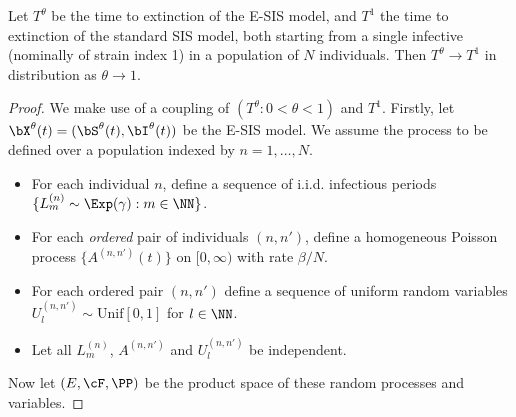 \documentclass[smallextended]{svjour3}       %
\begin{document}
\begin{mythm}\label{thm: tt 1}
	Let $T^{\theta}$ be the time to extinction of the E-SIS model, and $T^1$ the time to extinction of the standard SIS model, both starting from a single infective (nominally of strain index 1) in a population of $N$ individuals. Then $T^{\theta} \rightarrow T^1$ in distribution as $\theta \rightarrow 1$.
\end{mythm}
\begin{proof}
		We make use of a coupling of $(T^{\theta}: 0 <\theta < 1)$ and $T^1$. 
	 Firstly, let $\bX^\theta(t) = (\bS^\theta(t), \bI^\theta(t))$ be the E-SIS model.
	We assume the process to be defined over a population indexed by $n=1, \dots, N$.
	\begin{itemize}
		\item For each individual $n$, define a sequence of i.i.d. infectious periods $\{ L^{(n)}_m \sim \Exp (\gamma): m \in \NN \}$. 
		\item For each \emph{ordered} pair of individuals $(n, n')$, define a homogeneous Poisson process $\{A^{(n,n')}(t)\}$ on $[0,\infty)$ with rate $\beta/N$. 
		\item For each ordered pair $(n, n')$ define a sequence of uniform random variables $U^{(n,n')}_l \sim \text{Unif}[0,1]$ for $l \in \NN$. 
		\item Let all $L^{(n)}_m$, $A^{(n,n')}$ and $U_l^{(n,n')}$ be independent.
	\end{itemize}
	Now let $(E, \cF, \PP)$ be the product space of these random processes and variables.

\end{proof}
\end{document}
